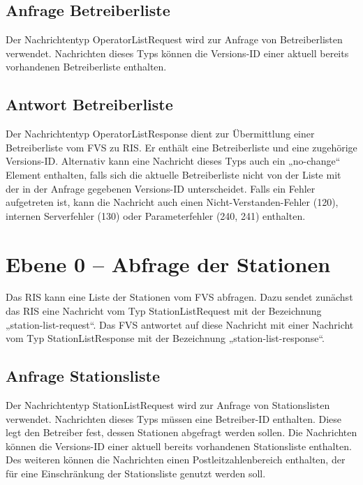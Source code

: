 

\subsection{Anfrage Betreiberliste}
Der Nachrichtentyp OperatorListRequest wird zur Anfrage von Betreiberlisten verwendet. Nachrichten dieses Typs können die Versions-ID einer aktuell bereits vorhandenen Betreiberliste enthalten.



\subsection{Antwort Betreiberliste}
Der Nachrichtentyp OperatorListResponse dient zur Übermittlung einer Betreiberliste vom FVS zu RIS. Er enthält eine Betreiberliste und eine zugehörige Versions-ID. Alternativ kann eine Nachricht dieses Typs auch ein „no-change“ Element enthalten, falls sich die aktuelle Betreiberliste nicht von der Liste mit der in der Anfrage gegebenen Versions-ID  unterscheidet. Falls ein Fehler aufgetreten ist, kann die Nachricht auch einen Nicht-Verstanden-Fehler (120), internen Serverfehler (130) oder Parameterfehler (240, 241) enthalten.




\section{Ebene 0 -- Abfrage der Stationen}
Das RIS kann eine Liste der Stationen vom FVS abfragen. Dazu sendet zunächst das RIS eine Nachricht vom Typ StationListRequest mit der Bezeichnung „station-list-request“. Das FVS antwortet auf diese Nachricht mit einer Nachricht vom Typ StationListResponse mit der Bezeichnung „station-list-response“.



\subsection{Anfrage Stationsliste}
Der Nachrichtentyp StationListRequest wird zur Anfrage von Stationslisten verwendet. Nachrichten dieses Typs müssen eine Betreiber-ID enthalten. Diese legt den Betreiber fest, dessen Stationen abgefragt werden sollen. Die Nachrichten können die Versions-ID einer aktuell bereits vorhandenen Stationsliste enthalten. Des weiteren können die Nachrichten einen Postleitzahlenbereich enthalten, der für eine Einschränkung der Stationsliste genutzt werden soll.

